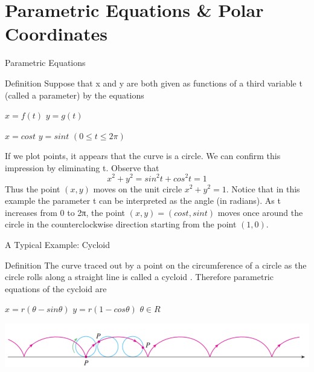 \documentclass{beamer}
\begin{document}
\section{Parametric Equations \& Polar Coordinates}
\begin{frame}{Parametric Equations} 
\begin{block}{Definition}
    Suppose that x and y are both given as functions of a third variable t
(called a parameter) by the equations\\
    \begin{center}
    $x=f(t)$  $y=g(t)$
    \end{center}
\end{block}
\begin{center}
$x=cost$ $y=sin t$ $(0 \leqslant t \leqslant 2\pi)$\\
\end{center}
If we plot points, it appears that the curve is a circle. We can confirm this
impression by eliminating t. Observe that
$$x^2+y^2=sin^2t +cos^2 t= 1$$
Thus the point $(x,y)$ moves on the unit circle $x^2+y^2=1$. Notice that in
this example the parameter t can be interpreted as the angle (in radians).
As t increases from 0 to 2π, the point $(x,y) = (cost,sint)$ moves once
around the circle in the counterclockwise direction starting from the point
$(1,0)$.
\end{frame}

\begin{frame}{A Typical Example: Cycloid}
\begin{block}{Definition}
   The curve traced out by a point on the circumference of a circle as the
circle rolls along a straight line is called a cycloid .
Therefore parametric equations of the cycloid are
\begin{center}
$x=r(\theta-sin\theta)$ $y=r(1-cos\theta)$ $ \theta \in R$
\end{center}
\end{block}
\begin{center}
    \includegraphics[width=0.95\linewidth]{Cycloid.png}
\end{center}
\end{frame}
\end{document}
